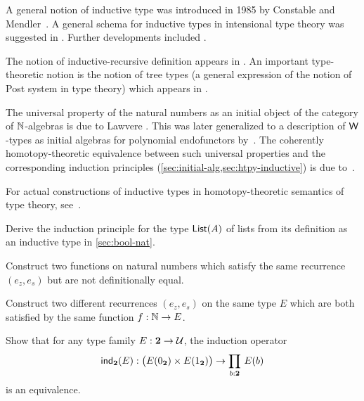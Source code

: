 A general notion of inductive type was introduced in 1985 by Constable and Mendler~\cite{DBLP:conf/lop/ConstableM85}.  A general schema for inductive types in intensional type theory was suggested in
\cite{PfenningPaulinMohring}.  Further developments included \cite{CoquandPaulin, Dybjer:1991}.

The notion of inductive-recursive definition appears in \cite{Dybjer:2000}. An important  type-theoretic notion is the notion of tree types (a general expression of the notion of Post system in type theory) which appears in \cite{PeterssonSynek}.

The universal property of the natural numbers as an initial object of the category of $\mathbb{N}$-algebras is due to Lawvere \cite{lawvere:adjinfound}.
This was later generalized to a description of $\mathsf{W}$-types as initial algebras for polynomial endofunctors by~\cite{mp:wftrees}.
The coherently homotopy-theoretic equivalence between such universal properties and the corresponding induction principles (\autoref{sec:initial-alg,sec:htpy-inductive}) is due to~\cite{ags:it-hott}.

For actual constructions of inductive types in homotopy-theoretic semantics of type theory, see~\cite{klv:ssetmodel,mvdb:wtypes,ls:hits}.

\sectionExercises

\begin{ex}
  Derive the induction principle for the type $\mathsf{List}(A)$ of lists from its definition as an inductive type in \autoref{sec:bool-nat}.
\end{ex}

\begin{ex}\label{ex:same-recurrence-not-defeq}
  Construct two functions on natural numbers which satisfy the same recurrence $(e_z, e_s)$ but are not definitionally equal.
\end{ex}

\begin{ex}\label{ex:one-function-two-recurrences}
  Construct two different recurrences $(e_z,e_s)$ on the same type $E$ which are both satisfied by the same function $f:\mathbb{N}\to E$.
\end{ex}

\begin{ex}\label{ex:bool}
  Show that for any type family $E : \mathbf{2} \to \mathcal{U}$, the induction operator
  \[ \ind{\bool}(E) : \big(E(\bfalse) \times E(\btrue)\big) \to \prd{b : \bool} E(b) \]
  is an equivalence.
\end{ex}


